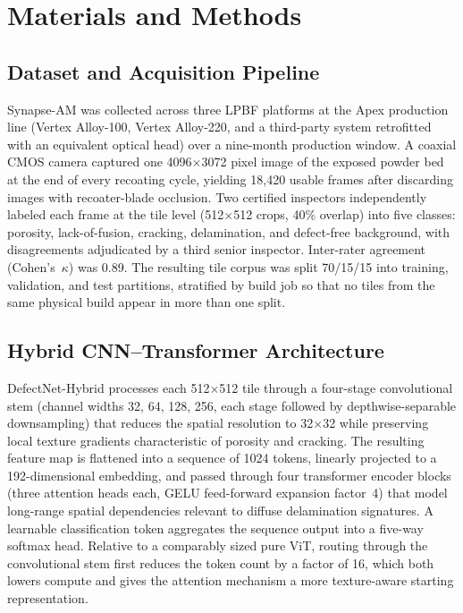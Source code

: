 \section{Materials and Methods}

\subsection{Dataset and Acquisition Pipeline}
Synapse-AM was collected across three LPBF platforms at the Apex production line (Vertex Alloy-100, Vertex Alloy-220, and a third-party system retrofitted with an equivalent optical head) over a nine-month production window. A coaxial CMOS camera captured one 4096$\times$3072 pixel image of the exposed powder bed at the end of every recoating cycle, yielding 18,420 usable frames after discarding images with recoater-blade occlusion. Two certified inspectors independently labeled each frame at the tile level (512$\times$512 crops, 40\% overlap) into five classes: porosity, lack-of-fusion, cracking, delamination, and defect-free background, with disagreements adjudicated by a third senior inspector. Inter-rater agreement (Cohen's~$\kappa$) was 0.89. The resulting tile corpus was split 70/15/15 into training, validation, and test partitions, stratified by build job so that no tiles from the same physical build appear in more than one split.

\subsection{Hybrid CNN--Transformer Architecture}
DefectNet-Hybrid processes each 512$\times$512 tile through a four-stage convolutional stem (channel widths 32, 64, 128, 256, each stage followed by depthwise-separable downsampling) that reduces the spatial resolution to 32$\times$32 while preserving local texture gradients characteristic of porosity and cracking. The resulting feature map is flattened into a sequence of 1024 tokens, linearly projected to a 192-dimensional embedding, and passed through four transformer encoder blocks (three attention heads each, GELU feed-forward expansion factor~4) that model long-range spatial dependencies relevant to diffuse delamination signatures. A learnable classification token aggregates the sequence output into a five-way softmax head. Relative to a comparably sized pure ViT, routing through the convolutional stem first reduces the token count by a factor of 16, which both lowers compute and gives the attention mechanism a more texture-aware starting representation.

